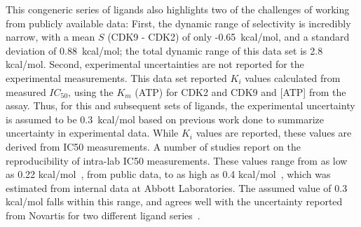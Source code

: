 \documentclass[phd,tocprelim]{cornell}
\begin{document}
This congeneric series of ligands also highlights two of the challenges of working from publicly available data: 
First, the dynamic range of selectivity is incredibly narrow, with a mean $S$ (CDK9 - CDK2) of only -0.65~kcal/mol, and a standard deviation of 0.88~kcal/mol; the total dynamic range of this data set is 2.8 kcal/mol. 
Second, experimental uncertainties are not reported for the experimental measurements. This data set reported $K_{i}$ values calculated from measured $IC_{50}$, using the $K_m$ (ATP) for CDK2 and CDK9 and [ATP] from the assay. 
Thus, for this and subsequent sets of ligands, the experimental uncertainty is assumed to be 0.3~kcal/mol based on previous work done to summarize uncertainty in experimental data. While $K_i$ values are reported, these values are derived from IC50 measurements. A number of studies report on the reproducibility of intra-lab IC50 measurements. These values range from as low as 0.22 kcal/mol~\citep{Hauser:2018vz}, from public data, to as high as 0.4 kcal/mol~\citep{BROWN2009420}, which was estimated from internal data at Abbott Laboratories. The assumed value of 0.3 kcal/mol falls within this range, and agrees well with the uncertainty reported from Novartis for two different ligand series~\citep{Kalliokoski:PloSOne:2013}. 
\end{document}
